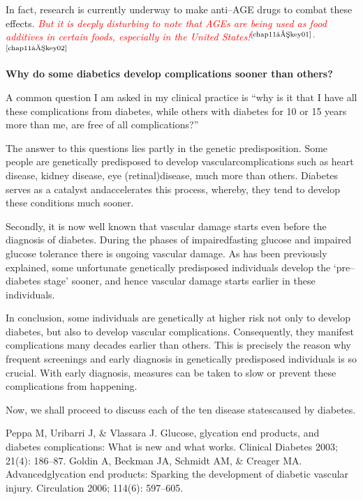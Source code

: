 In fact, research is currently underway to make anti–AGE drugs to combat these effects. \textcolor{red}{\textit{But it is deeply disturbing to note that AGEs are being used as food additives in certain foods, especially in the United States!}}$^{\text{\cite{chap11–key01}}}$$^,$$^{\text{\cite{chap11–key02}}}$

\noindent\textbf{Why do some diabetics develop complications sooner than others?}

A common question I am asked in my clinical practice is “why is it that I have all these complications from diabetes, while others with diabetes for 10 or 15 years more than me, are free of all complications?”

The answer to this questions lies partly in the genetic predis\-posi\-tion. Some people are genetically predisposed to develop vascular\break complications such as heart disease, kidney disease, eye (retinal)\break disease, much more than others. Diabetes serves as a catalyst and\break accelerates this process, whereby, they tend to develop these conditions much sooner.

Secondly, it is now well known that vascular damage starts even before the diagnosis of diabetes. During the phases of impaired\break fasting glucose and impaired glucose tolerance there is ongoing vascular damage. As has been previously explained, some unfortunate genetically predisposed individuals develop the ‘pre–diabetes stage’ sooner, and hence vascular damage starts earlier in these individuals.

In conclusion, some individuals are genetically at higher risk not only to develop diabetes, but also to develop vascular complications. Consequently, they manifest complications many decades earlier than others. This is precisely the reason why frequent screenings and early diagnosis in genetically predisposed individuals is so crucial. With early diagnosis, measures can be taken to slow or prevent these complications from happening.

Now, we shall proceed to discuss each of the ten disease states\break caused by diabetes.

\begin{thebibliography}{99}
 Peppa M, Uribarri J, \& Vlassara J. Glucose, glycation end products, and diabetes complications: What is new and what works. Clinical Diabetes 2003; 21(4): 186–87.
 Goldin A, Beckman JA, Schmidt AM, \& Creager MA. Advanced\break glycation end products: Sparking the development of diabetic vascular injury. Circulation 2006; 114(6): 597–605.
\end{thebibliography}


